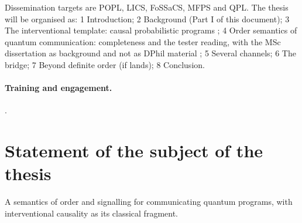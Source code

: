Dissemination targets are POPL, LICS, FoSSaCS, MFPS and QPL. The thesis will be organised as: 1 Introduction; 2 Background (Part I of this document); 3 The interventional template: causal probabilistic programs ; 4 Order semantics of quantum communication: completeness and the tester reading, with the MSc dissertation as background and not as DPhil material ; 5 Several channels; 6 The bridge; 7 Beyond definite order (if  lands); 8 Conclusion.

\paragraph{Training and engagement.} .

\section{Statement of the subject of the thesis}

A semantics of order and signalling for communicating quantum programs, with interventional causality as its classical fragment.
